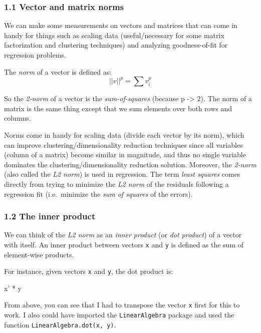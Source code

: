 \documentclass[11pt]{article}
\newenvironment{Shaded}{}{}
\newcommand{\NormalTok}[1]{{#1}}
\begin{document}
    \hypertarget{vector-and-matrix-norms}{%
\subsubsection{1.1 Vector and matrix norms
}\label{vector-and-matrix-norms}}

We can make some measurements on vectors and matrices that can come in
handy for things such as scaling data (useful/necessary for some matrix
factorization and clustering techniques) and analyzing goodness-of-fit
for regression problems.

The \emph{norm} of a vector is defined as:
\[\left|\left|v\right|\right|^{p} = \sum{v_i^p}\]

So the \emph{2-norm} of a vector is the \emph{sum-of-squares} (because p
-\textgreater{} 2). The norm of a matrix is the same thing except that
we sum elements over both rows and columns.

Norms come in handy for scaling data (divide each vector by its norm),
which can improve clustering/dimensionality reduction techniques since
all variables (column of a matrix) become similar in magnitude, and thus
no single variable dominates the clustering/dimensionality reduction
solution. Moreover, the \emph{2-norm} (also called the \emph{L2 norm})
is used in regression. The term \emph{least squares} comes directly from
trying to minimize the \emph{L2 norm} of the residuals following a
regression fit (i.e.~minimize the \emph{sum of squares} of the errors).

    \hypertarget{the-inner-product}{%
\subsubsection{1.2 The inner product }\label{the-inner-product}}

We can think of the \emph{L2 norm} as an \emph{inner product} (or
\emph{dot product}) of a vector with itself. An inner product between
vectors \texttt{x} and \texttt{y} is defined as the sum of element-wise
products.

For instance, given vectors \texttt{x} and \texttt{y}, the dot product
is:

\begin{Shaded}
\begin{Highlighting}[]
\NormalTok{x' * y}
\end{Highlighting}
\end{Shaded}

From above, you can see that I had to transpose the vector \texttt{x}
first for this to work. I also could have imported the
\texttt{LinearAlgebra} package and used the function
\texttt{LinearAlgebra.dot(x,\ y)}.
\end{document}

